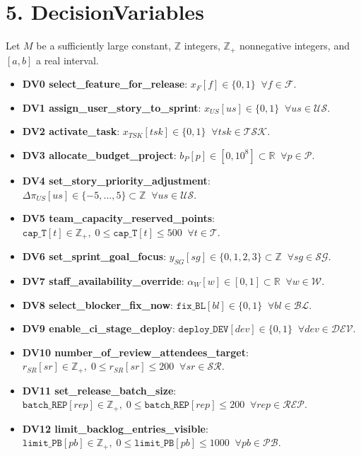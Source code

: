 \documentclass[11pt,a4paper]{article}
\begin{document}
\section{5. DecisionVariables}
Let $M$ be a sufficiently large constant, $\mathbb{Z}$ integers, $\mathbb{Z}_+$ nonnegative integers, and $[a,b]$ a real interval.

\begin{itemize}[leftmargin=2em]
  \item \textbf{DV0 \; select\_feature\_for\_release}:\; $x_F[f] \in \{0,1\}\;\; \forall f \in \mathcal{F}$.
  \item \textbf{DV1 \; assign\_user\_story\_to\_sprint}:\; $x_{US}[us] \in \{0,1\}\;\; \forall us \in \mathcal{US}$.
  \item \textbf{DV2 \; activate\_task}:\; $x_{TSK}[tsk] \in \{0,1\}\;\; \forall tsk \in \mathcal{TSK}$.
  \item \textbf{DV3 \; allocate\_budget\_project}:\; $b_P[p] \in [0,10^8] \subset \mathbb{R}\;\; \forall p \in \mathcal{P}$.
  \item \textbf{DV4 \; set\_story\_priority\_adjustment}:\; $\Delta\pi_{US}[us] \in \{-5,\dots,5\} \subset \mathbb{Z}\;\; \forall us \in \mathcal{US}$.
  \item \textbf{DV5 \; team\_capacity\_reserved\_points}:\; $\texttt{cap\_T}[t] \in \mathbb{Z}_+,\; 0 \le \texttt{cap\_T}[t] \le 500\;\; \forall t \in \mathcal{T}$.
  \item \textbf{DV6 \; set\_sprint\_goal\_focus}:\; $y_{SG}[sg] \in \{0,1,2,3\} \subset \mathbb{Z}\;\; \forall sg \in \mathcal{SG}$.
  \item \textbf{DV7 \; staff\_availability\_override}:\; $\alpha_W[w] \in [0,1] \subset \mathbb{R}\;\; \forall w \in \mathcal{W}$.
  \item \textbf{DV8 \; select\_blocker\_fix\_now}:\; $\texttt{fix\_BL}[bl] \in \{0,1\}\;\; \forall bl \in \mathcal{BL}$.
  \item \textbf{DV9 \; enable\_ci\_stage\_deploy}:\; $\texttt{deploy\_DEV}[dev] \in \{0,1\}\;\; \forall dev \in \mathcal{DEV}$.
  \item \textbf{DV10 \; number\_of\_review\_attendees\_target}:\; $r_{SR}[sr] \in \mathbb{Z}_+,\; 0 \le r_{SR}[sr] \le 200\;\; \forall sr \in \mathcal{SR}$.
  \item \textbf{DV11 \; set\_release\_batch\_size}:\; $\texttt{batch\_REP}[rep] \in \mathbb{Z}_+,\; 0 \le \texttt{batch\_REP}[rep] \le 200\;\; \forall rep \in \mathcal{REP}$.
  \item \textbf{DV12 \; limit\_backlog\_entries\_visible}:\; $\texttt{limit\_PB}[pb] \in \mathbb{Z}_+,\; 0 \le \texttt{limit\_PB}[pb] \le 1000\;\; \forall pb \in \mathcal{PB}$.
\end{itemize}
\end{document}
